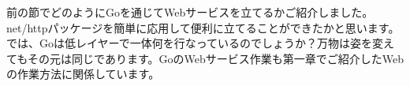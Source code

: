 前の節でどのようにGoを通じてWebサービスを立てるかご紹介しました。net/httpパッケージを簡単に応用して便利に立てることができたかと思います。では、Goは低レイヤーで一体何を行なっているのでしょうか？万物は姿を変えてもその元は同じであります。GoのWebサービス作業も第一章でご紹介したWebの作業方法に関係しています。

